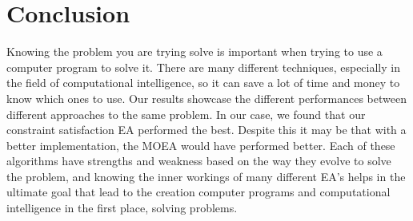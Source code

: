 \documentclass[11pt]{article}
\begin{document}
\section{Conclusion}
Knowing the problem you are trying solve is important when trying to use a computer program to solve
it. There are many different techniques, especially in the field of computational intelligence, so it 
can save a lot of time and money to know which ones to use. Our results showcase the different performances
between different approaches to the same problem. In our case, we found that our constraint satisfaction EA 
performed the best. Despite this it may be that with a better implementation, the MOEA would have performed 
better.
Each of these algorithms have strengths and weakness based on the way they evolve to solve the problem,
and knowing the inner workings of many different EA's helps in the ultimate goal that lead to the creation
computer programs and computational intelligence in the first place, solving problems.
\end{document}
